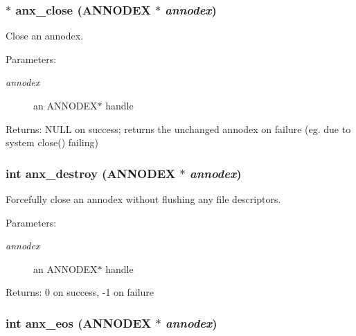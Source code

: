 \subsubsection{$\ast$ anx\_\-close ({\bf ANNODEX} $\ast$ {\em annodex})}\label{anx__general_8h_a7}


Close an annodex. 

\begin{Desc}
\item[Parameters:]
\begin{description}
\item[{\em annodex}]an ANNODEX$\ast$ handle \end{description}
\end{Desc}
\begin{Desc}
\item[Returns:]NULL on success; returns the unchanged annodex on failure (eg. due to system close() failing) \end{Desc}
\subsubsection{\setlength{\rightskip}{0pt plus 5cm}int anx\_\-destroy ({\bf ANNODEX} $\ast$ {\em annodex})}\label{anx__general_8h_a8}


Forcefully close an annodex without flushing any file descriptors. 

\begin{Desc}
\item[Parameters:]
\begin{description}
\item[{\em annodex}]an ANNODEX$\ast$ handle \end{description}
\end{Desc}
\begin{Desc}
\item[Returns:]0 on success, -1 on failure \end{Desc}
\subsubsection{\setlength{\rightskip}{0pt plus 5cm}int anx\_\-eos ({\bf ANNODEX} $\ast$ {\em annodex})}\label{anx__general_8h_a10}


